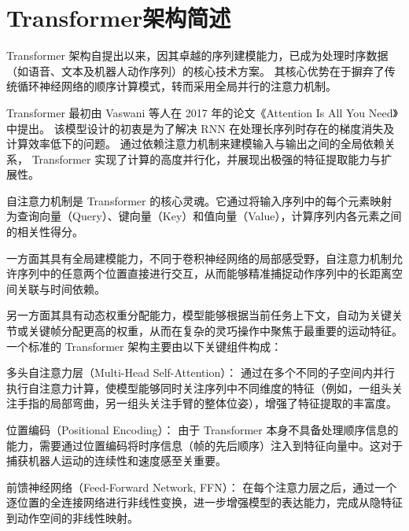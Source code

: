 \section{Transformer架构简述}
Transformer 架构自提出以来，因其卓越的序列建模能力，已成为处理时序数据（如语音、文本及机器人动作序列）的核心技术方案。
其核心优势在于摒弃了传统循环神经网络的顺序计算模式，转而采用全局并行的注意力机制。

Transformer 最初由 Vaswani 等人在 2017 年的论文《Attention Is All You Need》中提出\cite{vaswaniAttentionAllYou2017a}。
该模型设计的初衷是为了解决 RNN 在处理长序列时存在的梯度消失及计算效率低下的问题。
通过依赖注意力机制来建模输入与输出之间的全局依赖关系，
Transformer 实现了计算的高度并行化，并展现出极强的特征提取能力与扩展性。

自注意力机制是 Transformer 的核心灵魂。它通过将输入序列中的每个元素映射为查询向量（Query）、键向量（Key）和值向量（Value），计算序列内各元素之间的相关性得分。

一方面其具有全局建模能力，不同于卷积神经网络的局部感受野，自注意力机制允许序列中的任意两个位置直接进行交互，从而能够精准捕捉动作序列中的长距离空间关联与时间依赖。

另一方面其具有动态权重分配能力，模型能够根据当前任务上下文，自动为关键关节或关键帧分配更高的权重，从而在复杂的灵巧操作中聚焦于最重要的运动特征。
一个标准的 Transformer 架构主要由以下关键组件构成：

多头自注意力层（Multi-Head Self-Attention）：
通过在多个不同的子空间内并行执行自注意力计算，使模型能够同时关注序列中不同维度的特征（例如，一组头关注手指的局部弯曲，另一组头关注手臂的整体位姿），增强了特征提取的丰富度。

位置编码（Positional Encoding）：
由于 Transformer 本身不具备处理顺序信息的能力，需要通过位置编码将时序信息（帧的先后顺序）注入到特征向量中。这对于捕获机器人运动的连续性和速度感至关重要。

前馈神经网络（Feed-Forward Network, FFN）：
在每个注意力层之后，通过一个逐位置的全连接网络进行非线性变换，进一步增强模型的表达能力，完成从隐特征到动作空间的非线性映射。

